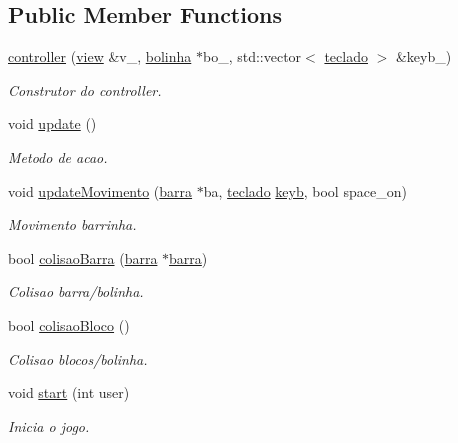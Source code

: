 \subsection*{Public Member Functions}
\begin{DoxyCompactItemize}
\item 
\hyperlink{classcontroller_a245fd98c0a70dd1404edda55ec889998}{controller} (\hyperlink{classview}{view} \&v\+\_\+, \hyperlink{classbolinha}{bolinha} $\ast$bo\+\_\+, std\+::vector$<$ \hyperlink{classteclado}{teclado} $>$ \&keyb\+\_\+)
\begin{DoxyCompactList}\small\item\em Construtor do controller. \end{DoxyCompactList}\item 
void \hyperlink{classcontroller_ac0373785a91924ce3d480c1c7dedbd99}{update} ()
\begin{DoxyCompactList}\small\item\em Metodo de acao. \end{DoxyCompactList}\item 
void \hyperlink{classcontroller_a419ed502b0ed9a58c409e228edc0d0f4}{update\+Movimento} (\hyperlink{classbarra}{barra} $\ast$ba, \hyperlink{classteclado}{teclado} \hyperlink{classcontroller_a00fc5e42acc7af64df818c8f0dfb4a90}{keyb}, bool space\+\_\+on)
\begin{DoxyCompactList}\small\item\em Movimento barrinha. \end{DoxyCompactList}\item 
bool \hyperlink{classcontroller_a498f1975d59eda5db0a9fe02bd776255}{colisao\+Barra} (\hyperlink{classbarra}{barra} $\ast$\hyperlink{classbarra}{barra})
\begin{DoxyCompactList}\small\item\em Colisao barra/bolinha. \end{DoxyCompactList}\item 
bool \hyperlink{classcontroller_ac227dd1b72111d1c6da3362d60aa25d6}{colisao\+Bloco} ()
\begin{DoxyCompactList}\small\item\em Colisao blocos/bolinha. \end{DoxyCompactList}\item 
void \hyperlink{classcontroller_a1f0577d4c55a9ea02c5d87218773e521}{start} (int user)
\begin{DoxyCompactList}\small\item\em Inicia o jogo. \end{DoxyCompactList}\item 

\end{DoxyCompactItemize}
